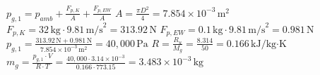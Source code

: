 \( p_{g,1} = p_{amb} + \frac{F_{p,K}}{A} + \frac{F_{p,EW}}{A} \)  
\( A = \frac{\pi D^2}{4} = 7.854 \times 10^{-3} \, \text{m}^2 \)  
\( F_{p,K} = 32 \, \text{kg} \cdot 9.81 \, \text{m/s}^2 = 313.92 \, \text{N} \)  
\( F_{p,EW} = 0.1 \, \text{kg} \cdot 9.81 \, \text{m/s}^2 = 0.981 \, \text{N} \)  
\( p_{g,1} = \frac{313.92 \, \text{N} + 0.981 \, \text{N}}{7.854 \times 10^{-3} \, \text{m}^2} = 40,000 \, \text{Pa} \)  
\( R = \frac{R_u}{M_g} = \frac{8.314}{50} = 0.166 \, \text{kJ/kg·K} \)  
\( m_g = \frac{p_{g,1} \cdot V}{R \cdot T} = \frac{40,000 \cdot 3.14 \times 10^{-3}}{0.166 \cdot 773.15} = 3.483 \times 10^{-3} \, \text{kg} \)